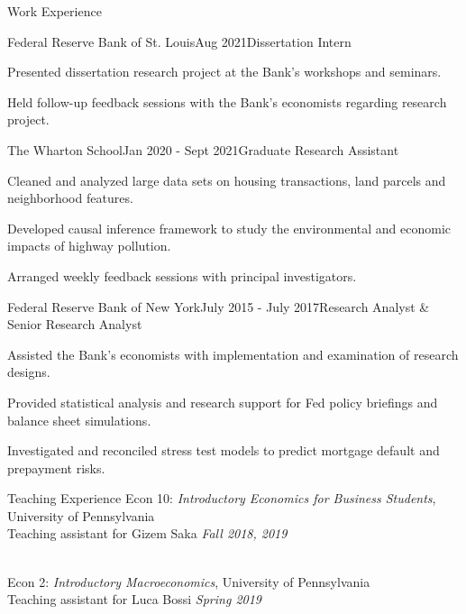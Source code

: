 \documentclass{resume}
\begin{document}
\begin{rSection}{Work Experience}
\begin{rSubsection}{Federal Reserve Bank of St. Louis}{Aug 2021}{Dissertation Intern}{}
    \item Presented dissertation research project at the Bank's workshops and seminars.
    \item Held follow-up feedback sessions with the Bank's economists regarding research project.
\end{rSubsection}

\begin{rSubsection}{The Wharton School}{Jan 2020 - Sept 2021}{Graduate Research Assistant}{}
    \item Cleaned and analyzed large data sets on housing transactions, land parcels and neighborhood features.
    \item Developed causal inference framework to study the environmental and economic impacts of highway pollution.
    \item Arranged weekly feedback sessions with principal investigators.
\end{rSubsection}

\begin{rSubsection}{Federal Reserve Bank of New York}{July 2015 - July 2017}{Research Analyst \& Senior Research Analyst}{}
    \item Assisted the Bank's economists with implementation and examination of research designs.
    \item Provided statistical analysis and research support for Fed policy briefings and balance sheet simulations.
    \item Investigated and reconciled stress test models to predict mortgage default and prepayment risks.
\end{rSubsection}

\end{rSection}

\begin{rSection}{Teaching Experience}
Econ 10: \textit{Introductory Economics for Business Students}, University of Pennsylvania
\\ Teaching assistant for Gizem Saka \hfill {\em Fall 2018, 2019}

\\Econ 2: \textit{Introductory Macroeconomics}, University of Pennsylvania
\\ Teaching assistant for Luca Bossi \hfill {\em Spring 2019}
\end{rSection}
\end{document}
